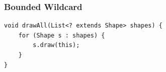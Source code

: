 \documentclass{beamer}
\begin{document}
\begin{frame}[fragile]
\frametitle{Bounded Wildcard}
\begin{framed}
\begin{lstlisting}
void drawAll(List<? extends Shape> shapes) { 
    for (Shape s : shapes) {
        s.draw(this); 
    }
}
\end{lstlisting}
\end{framed}
\end{frame}




\end{document}
